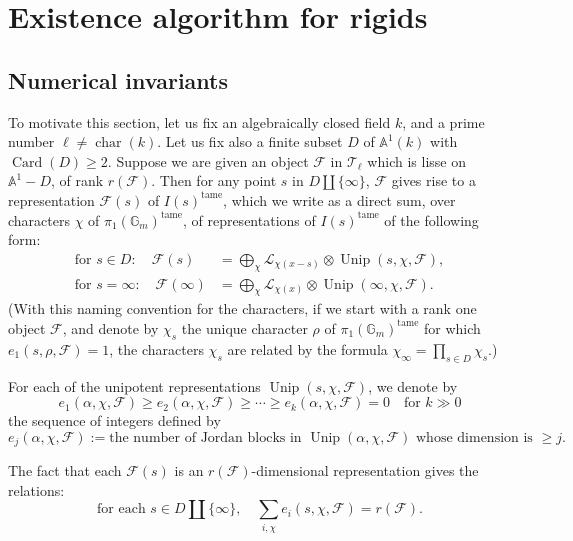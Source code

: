 \chapter{Existence algorithm for rigids}
\label{chap:6}
\setcounter{section}{-1}

\section{Numerical invariants}
\label{sec:6.0}

To motivate this section, let us fix an algebraically closed field \(k\), and a prime number \(\ell\ne\operatorname{char}(k)\). Let us fix also a finite subset \(D\) of \(\mathbb{A}^1(k)\) with \(\operatorname{Card}(D)\geq 2\). Suppose we are given an object \(\mathcal{F}\) in \(\mathcal{T}_\ell\) which is lisse on \(\mathbb{A}^1-D\), of rank \(r(\mathcal{F})\). Then for any point \(s\) in \(D\amalg\{\infty\}\), \(\mathcal{F}\) gives rise to a representation \(\mathcal{F}(s)\) of \(I(s)^{\mathrm{tame}}\), which we write as a direct sum, over characters \(\chi\) of \(\pi_1(\mathbb{G}_m)^{\mathrm{tame}}\), of representations of \(I(s)^{\mathrm{tame}}\) of the following form:
\[
\begin{aligned}
\text{for }s\in D:\quad
\mathcal{F}(s)&=\bigoplus_\chi \mathcal{L}_{\chi(x-s)}\otimes\operatorname{Unip}(s,\chi,\mathcal{F}),\\
\text{for }s=\infty:\quad
\mathcal{F}(\infty)&=\bigoplus_\chi \mathcal{L}_{\chi(x)}\otimes\operatorname{Unip}(\infty,\chi,\mathcal{F}).
\end{aligned}
\]
(With this naming convention for the characters, if we start with a rank one object \(\mathcal{F}\), and denote by \(\chi_s\) the unique character \(\rho\) of \(\pi_1(\mathbb{G}_m)^{\mathrm{tame}}\) for which \(e_1(s,\rho,\mathcal{F})=1\), the characters \(\chi_s\) are related by the formula \(\chi_\infty=\prod_{s\in D}\chi_s\).)

For each of the unipotent representations \(\operatorname{Unip}(s,\chi,\mathcal{F})\), we denote by
\[
e_1(\alpha,\chi,\mathcal{F})\geq e_2(\alpha,\chi,\mathcal{F})\geq\cdots\geq e_k(\alpha,\chi,\mathcal{F})=0\quad\text{for }k\gg 0
\]
the sequence of integers defined by
\[
e_j(\alpha,\chi,\mathcal{F}) := \text{the number of Jordan blocks in }\operatorname{Unip}(\alpha,\chi,\mathcal{F})\text{ whose dimension is }\geq j.
\]

The fact that each \(\mathcal{F}(s)\) is an \(r(\mathcal{F})\)-dimensional representation gives the relations:
\[
\text{for each }s\in D\amalg\{\infty\},\quad \sum_{i,\chi} e_i(s,\chi,\mathcal{F})=r(\mathcal{F}).
\]

